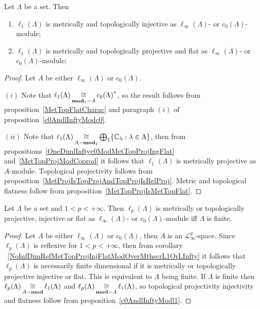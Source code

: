 \begin{proposition}\label{c0AndlInftyModl1} Let $\Lambda$ be a set. Then

\begin{enumerate}[label = (\roman*)]
    \item $\ell_1(\Lambda)$ is metrically and topologically injective as
    $\ell_\infty(\Lambda)$- or $c_0(\Lambda)$-module;

    \item $\ell_1(\Lambda)$ is metrically and topologically projective and 
    flat as $\ell_\infty(\Lambda)$- or $c_0(\Lambda)$-module;
\end{enumerate}
\end{proposition}
\begin{proof} Let $A$ be either $\ell_\infty(\Lambda)$ or $c_0(\Lambda)$.

$(i)$ Note that $\ell_1(\Lambda)\mathop{\mathbin{\cong}}\limits_{\mathbf{mod}_1-A}{c_0(\Lambda)}^*$, so the
result follows from proposition~\ref{MetTopFlatCharac} and paragraph $(i)$ of
proposition~\ref{c0AndlInftyModc0}.

$(ii)$ Note that 
$\ell_1(\Lambda)
\mathop{\mathbin{\cong}}\limits_{A-\mathbf{mod}_1}
\bigoplus_1 \{\mathbb{C}_\lambda:\lambda\in\Lambda \}$, then from
propositions~\ref{OneDimlInftyc0ModMetTopProjIngFlat}
and~\ref{MetTopProjModCoprod} it follows that $\ell_1(\Lambda)$ is metrically
projective as $A$-module. Topological projectivity follows from
proposition~\ref{MetProjIsTopProjAndTopProjIsRelProj}. Metric and topological
flatness follow from proposition~\ref{MetTopProjIsMetTopFlat}.
\end{proof}

\begin{proposition}\label{c0AndlInftyModlp} Let $\Lambda$ be a set and
$1<p<+\infty$. Then $\ell_p(\Lambda)$ is metrically or topologically projective,
injective or flat as $\ell_\infty(\Lambda)$- or $c_0(\Lambda)$-module iff
$\Lambda$ is finite.
\end{proposition}
\begin{proof} Let $A$ be either $\ell_\infty(\Lambda)$ or $c_0(\Lambda)$, then
$A$ is an $\mathscr{L}_\infty^g$-space. Since $\ell_p(\Lambda)$ is reflexive for
$1<p<+\infty$, then from corollary
~\ref{NoInfDimRefMetTopProjInjFlatModOverMthscrL1OrLInfty} it follows that
$\ell_p(\Lambda)$ is necessarily finite dimensional if it is metrically or
topologically projective injective or flat. This is equivalent to $\Lambda$
being finite. If $\Lambda$ is finite then
$\ell_p(\Lambda)\mathop{\mathbin{\cong}}\limits_{A-\mathbf{mod}}\ell_1(\Lambda)$ and
$\ell_p(\Lambda)\mathop{\mathbin{\cong}}\limits_{\mathbf{mod}-A}\ell_1(\Lambda)$, so topological
projectivity injectivity and flatness follow from
proposition~\ref{c0AndlInftyModl1}.
\end{proof}

